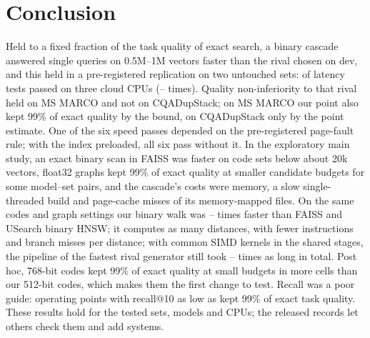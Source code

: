 \section{Conclusion}\label{sec:conclusion}

Held to a fixed fraction of the task quality of exact search, a binary cascade answered single queries on 0.5M--1M
vectors faster than the rival chosen on dev, and this held in a pre-registered replication on two untouched sets:
 of  latency tests passed on three cloud CPUs (-- times). Quality
non-inferiority to that rival held on MS MARCO and not on CQADupStack; on MS MARCO our point also kept 99\% of exact
quality by the bound, on CQADupStack only by the point estimate. One of the six speed passes depended on the
pre-registered page-fault rule; with the index preloaded, all six pass without it. In the exploratory main study, an exact binary scan in FAISS was faster on code sets
below about 20k vectors, float32 graphs kept 99\% of exact quality at smaller candidate budgets for some model--set
pairs, and the cascade's costs were memory, a slow single-threaded build and page-cache misses of its memory-mapped
files. On the same codes and graph settings our binary walk was -- times faster than
FAISS and USearch binary HNSW; it computes as many distances, with fewer instructions and branch misses per distance; with common SIMD kernels in the
shared stages, the pipeline of the fastest rival generator still took -- times as long in total. Post hoc, 768-bit codes kept 99\% of exact
quality at small budgets in more cells than our 512-bit codes, which makes them the first change to test. Recall was a poor guide: operating points with recall@10 as low as  kept
99\% of exact task quality. These results hold for the tested sets, models and CPUs; the released records let others
check them and add systems.
